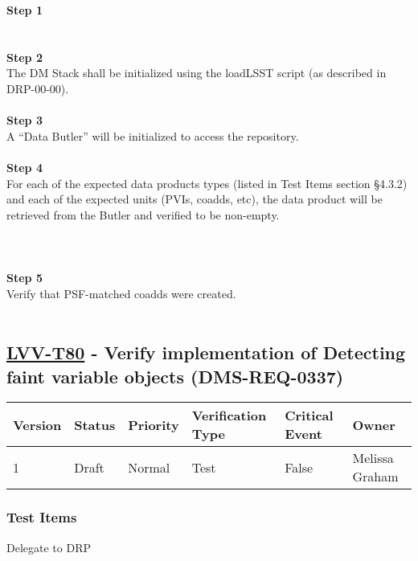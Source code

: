 \textbf{Step 1}\\
~\\
~\\
\textbf{Step 2}\\
The DM Stack shall be initialized using the loadLSST script (as
described in DRP-00-00).\\
~\\
\textbf{Step 3}\\
A ``Data Butler'' will be initialized to access the repository.\\
~\\
\textbf{Step 4}\\
For each of the expected data products types (listed in Test Items
section §4.3.2) and each of the expected units (PVIs, coadds, etc), the
data product will be retrieved from the Butler and verified to be
non-empty.\\
~\\
~\\
~\\
\textbf{Step 5}\\
Verify that PSF-matched coadds were created.\\
~\\

\hypertarget{lvv-t80---verify-implementation-of-detecting-faint-variable-objects-dms-req-0337}{%
\subsection{\texorpdfstring{\href{https://jira.lsstcorp.org/secure/Tests.jspa\#/testCase/LVV-T80}{LVV-T80}
- Verify implementation of Detecting faint variable objects
(DMS-REQ-0337)}{LVV-T80 - Verify implementation of Detecting faint variable objects (DMS-REQ-0337)}}\label{lvv-t80---verify-implementation-of-detecting-faint-variable-objects-dms-req-0337}}

\begin{longtable}[]{@{}llllll@{}}
\toprule
Version & Status & Priority & Verification Type & Critical Event &
Owner\tabularnewline
\midrule
\endhead
1 & Draft & Normal & Test & False & Melissa Graham\tabularnewline
\bottomrule
\end{longtable}

\hypertarget{test-items-56}{%
\subsubsection{Test Items}\label{test-items-56}}

Delegate to DRP

